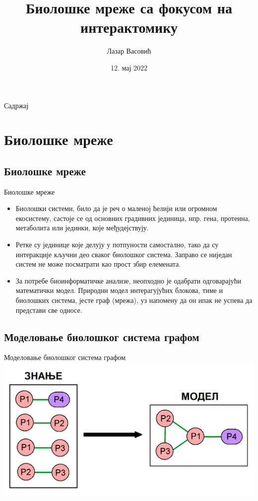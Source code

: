 \documentclass[hyperref={bookmarks=false}]{beamer}
\title[Интерактомика]{Биолошке мреже са фокусом на интерактомику}
\author{Лазар Васовић}
\institute[]{Математички факултет, Универзитет у Београду\\\url{https://github.com/matfija/Neuredjenost-u-interaktomu}}
\date[Математички факултет]{12. мај 2022}
\begin{document}
\frame{\titlepage}

\begin{frame}{Садржај}
\tableofcontents[subsectionstyle=hide]
\end{frame}

\section{Биолошке мреже}
\subsection{Биолошке мреже}
\begin{frame}{Биолошке мреже}
\begin{itemize}
	\item Биолошки системи, било да је реч о маленој ћелији или огромном екосистему, састоје се од основних градивних јединица, нпр. гена, протеина, метаболита или јединки, које међудејствују.

	\item Ретке су јединице које делују у потпуности самостално, тако да су интеракције кључни део сваког биолошког система. Заправо се ниједан систем не може посматрати као прост збир елемената.

	\item За потребе биоинформатичке анализе, неопходно је одабрати одговарајући математички модел. Природни модел интерагујућих блокова, тиме и биолошких система, јесте граф (мрежа), уз напомену да он ипак не успева да представи све односе.
\end{itemize}
\end{frame}

\subsection{Моделовање биолошког система графом}
\begin{frame}{Моделовање биолошког система графом}
\centering\includegraphics[width=.95\textwidth]{modelovanje.png}
\end{frame}
\end{document}
